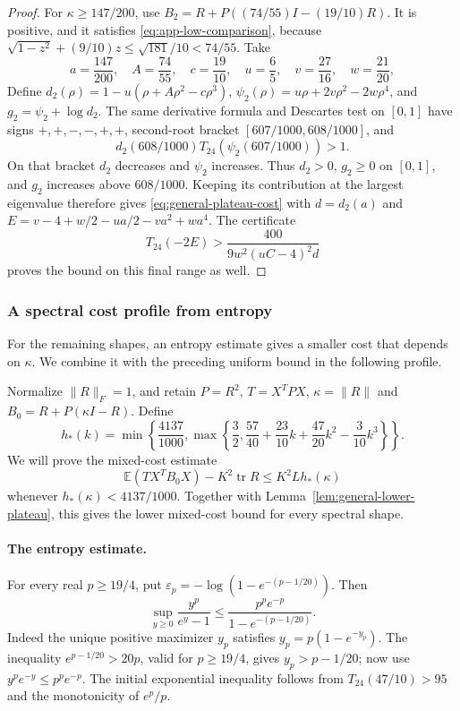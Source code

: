 \documentclass[11pt,a4paper]{article}
\numberwithin{equation}{section}
\begin{document}
\begin{proof}
For $\kappa\ge147/200$, use $B_2=R+P((74/55)I-(19/10)R)$.
It is positive, and it satisfies \eqref{eq:app-low-comparison}, because
$\sqrt{1-z^2}+(9/10)z\le\sqrt{181}/10<74/55$.
Take
\[
 a=\frac{147}{200},\quad A=\frac{74}{55},\quad c=\frac{19}{10},\quad
 u=\frac65,\quad v=\frac{27}{16},\quad w=\frac{21}{20},
\]
Define $d_2(\rho)=1-u(\rho+A\rho^2-c\rho^3)$,
$\psi_2(\rho)=u\rho+2v\rho^2-2w\rho^4$, and $g_2=\psi_2+\log d_2$.
The same derivative formula and Descartes test on $[0,1]$ have signs
$+,+,-,-,+,+$, second-root bracket $[607/1000,608/1000]$, and
\[
 d_2(608/1000)T_{24}(\psi_2(607/1000))>1.
\]
On that bracket $d_2$ decreases and $\psi_2$ increases.
Thus $d_2>0$, $g_2\ge0$ on $[0,1]$, and $g_2$ increases above $608/1000$.
Keeping its contribution at the largest eigenvalue therefore gives
\eqref{eq:general-plateau-cost} with
$d=d_2(a)$ and $E=v-4+w/2-ua/2-va^2+wa^4$.
The certificate
\[
 T_{24}(-2E)
 >\frac{400}{9w^2(uC-4)^2d}
\]
proves the bound on this final range as well.
\end{proof}

\subsubsection{A spectral cost profile from entropy}
For the remaining shapes, an entropy estimate gives a smaller cost that
depends on $\kappa$. We combine it with the preceding uniform bound in
the following profile.

Normalize $\|R\|_F=1$, and retain $P=R^2$, $T=X^TPX$,
$\kappa=\|R\|$ and $B_0=R+P(\kappa I-R)$. Define
\begin{equation}\label{eq:app-new-lower-profile}
 h_*(k)=\min\left\{\frac{4137}{1000},
    \max\left\{\frac32,\frac{57}{40}+\frac{23}{10}k
                    +\frac{47}{20}k^2-\frac3{10}k^3\right\}\right\}.
\end{equation}
We will prove the mixed-cost estimate
\begin{equation}\label{eq:app-new-lower-mixed}
 \mathbb E(TX^TB_0X)-K^2\operatorname{tr}R
       \le K^2L h_*(\kappa)
\end{equation}
whenever $h_*(\kappa)<4137/1000$.
Together with Lemma~\ref{lem:general-lower-plateau}, this gives the lower
mixed-cost bound for every spectral shape.

\paragraph{The entropy estimate.}
For every real $p\ge19/4$, put
$\varepsilon_p=-\log(1-e^{-(p-1/20)})$. Then
\begin{equation}\label{eq:app-moment-exponential}
 \sup_{y\ge0}\frac{y^p}{e^y-1}
 \le \frac{p^p e^{-p}}{1-e^{-(p-1/20)}}.
\end{equation}
Indeed the unique positive maximizer $y_p$ satisfies
$y_p=p(1-e^{-y_p})$. The inequality
$e^{p-1/20}>20p$, valid for $p\ge19/4$, gives $y_p>p-1/20$;
now use $y^pe^{-y}\le p^pe^{-p}$.
The initial exponential inequality follows from
$T_{24}(47/10)>95$ and the monotonicity of $e^p/p$.
\end{document}

